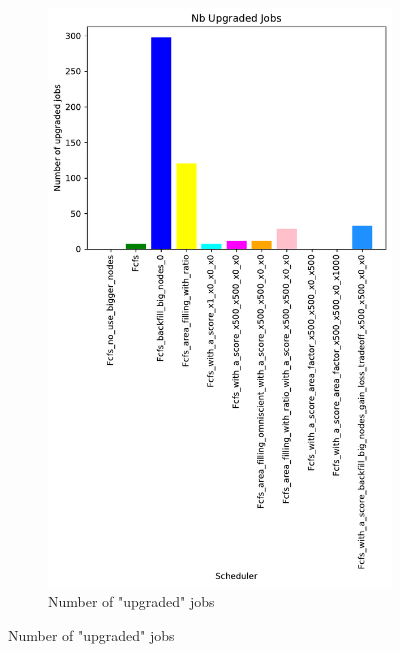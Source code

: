 \documentclass[a4paper]{article}
\begin{document}
\begin{figure}[H]
\begin{subfigure}[b]{0.4\linewidth}\centering\includegraphics[width=0.7\linewidth]{MBSS/plot/Results_Size_And_Data_2022-03-01->2022-03-03_V9271_Nb_Upgraded_Jobs_450_128_32_256_4_1024.pdf}\caption{Number of "upgraded" jobs}\label{45}\end{subfigure}

\end{figure}
\end{document}
